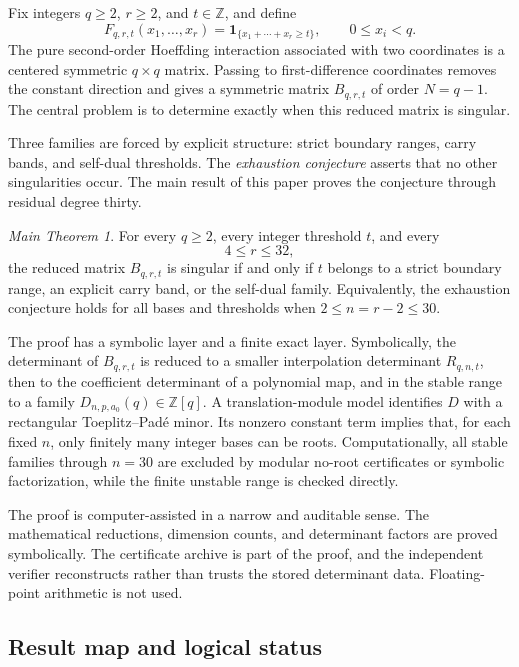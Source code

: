 \documentclass[11pt]{amsart}
\newcommand{\Z}{\mathbb Z}
\newcommand{\1}{\mathbf 1}
\theoremstyle{remark}
\newtheorem*{mainthm}{Main Theorem}
\begin{document}
Fix integers $q\ge2$, $r\ge2$, and $t\in\Z$, and define
\[
 F_{q,r,t}(x_1,\ldots,x_r)=\mathbf 1_{\{x_1+\cdots+x_r\ge t\}},
 \qquad 0\le x_i<q.
\]
The pure second-order Hoeffding interaction associated with two coordinates is a centered symmetric $q\times q$ matrix. Passing to first-difference coordinates removes the constant direction and gives a symmetric matrix $B_{q,r,t}$ of order $N=q-1$. The central problem is to determine exactly when this reduced matrix is singular.

Three families are forced by explicit structure: strict boundary ranges, carry bands, and self-dual thresholds. The \emph{exhaustion conjecture} asserts that no other singularities occur. The main result of this paper proves the conjecture through residual degree thirty.

\begin{mainthm}
For every $q\ge2$, every integer threshold $t$, and every
\[
 4\le r\le32,
\]
the reduced matrix $B_{q,r,t}$ is singular if and only if $t$ belongs to a strict boundary range, an explicit carry band, or the self-dual family. Equivalently, the exhaustion conjecture holds for all bases and thresholds when $2\le n=r-2\le30$.
\end{mainthm}

The proof has a symbolic layer and a finite exact layer. Symbolically, the determinant of $B_{q,r,t}$ is reduced to a smaller interpolation determinant $R_{q,n,t}$, then to the coefficient determinant of a polynomial map, and in the stable range to a family $D_{n,p,a_0}(q)\in\Z[q]$. A translation-module model identifies $D$ with a rectangular Toeplitz--Pad\'e minor. Its nonzero constant term implies that, for each fixed $n$, only finitely many integer bases can be roots. Computationally, all stable families through $n=30$ are excluded by modular no-root certificates or symbolic factorization, while the finite unstable range is checked directly.

The proof is computer-assisted in a narrow and auditable sense. The mathematical reductions, dimension counts, and determinant factors are proved symbolically. The certificate archive is part of the proof, and the independent verifier reconstructs rather than trusts the stored determinant data. Floating-point arithmetic is not used.

\subsection{Result map and logical status}
\end{document}
